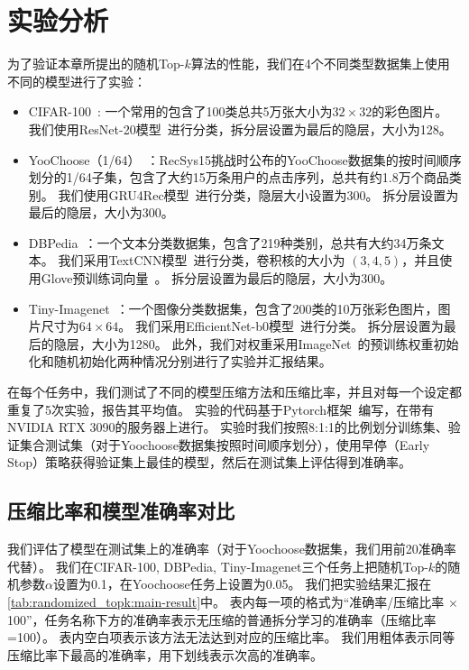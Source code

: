 \section{实验分析}

为了验证本章所提出的随机Top-$k$算法的性能，我们在4个不同类型数据集上使用不同的模型进行了实验：
\begin{itemize}
    \item CIFAR-100~\cite{krizhevsky_2009_cifar}: 一个常用的包含了100类总共5万张大小为$32\times 32$的彩色图片。
        我们使用ResNet-20模型~\cite{hekaiming2016resnet}进行分类，拆分层设置为最后的隐层，大小为128。
    \item YooChoose（1/64）~\cite{ben2015yoochoose,lijing_2017_narm}：RecSys15挑战时公布的YooChoose数据集的按时间顺序划分的1/64子集，包含了大约15万条用户的点击序列，总共有约1.8万个商品类别。
        我们使用GRU4Rec模型~\cite{hidasi_2016_gru4rec}进行分类，隐层大小设置为300。
        拆分层设置为最后的隐层，大小为300。
    \item DBPedia~\cite{2007dbpedia}：一个文本分类数据集，包含了219种类别，总共有大约34万条文本。
        我们采用TextCNN模型~\cite{kimyoon2014textcnn}进行分类，卷积核的大小为 $(3,4,5)$，并且使用Glove预训练词向量~\cite{pennington2014glove}。
        拆分层设置为最后的隐层，大小为300。
    \item Tiny-Imagenet~\cite{tiny-imagenet}：一个图像分类数据集，包含了200类的10万张彩色图片，图片尺寸为$64\times 64$。
        我们采用EfficientNet-b0模型~\cite{tanmingxing2019efficientnet}进行分类。
        拆分层设置为最后的隐层，大小为1280。
        此外，我们对权重采用ImageNet~\cite{2009_imagenet}的预训练权重初始化和随机初始化两种情况分别进行了实验并汇报结果。
\end{itemize}
%
在每个任务中，我们测试了不同的模型压缩方法和压缩比率，并且对每一个设定都重复了5次实验，报告其平均值。
%
实验的代码基于Pytorch框架~\cite{2019_pytorch}编写，在带有NVIDIA RTX 3090的服务器上进行。
%
实验时我们按照8:1:1的比例划分训练集、验证集合测试集（对于Yoochoose数据集按照时间顺序划分），使用早停（Early Stop）策略获得验证集上最佳的模型，然后在测试集上评估得到准确率。



\subsection{压缩比率和模型准确率对比}
%
我们评估了模型在测试集上的准确率（对于Yoochoose数据集，我们用前20准确率代替）。
%
我们在CIFAR-100, DBPedia, Tiny-Imagenet三个任务上把随机Top-$k$的随机参数$\alpha$设置为0.1，在Yoochoose任务上设置为0.05。
%
我们把实验结果汇报在\autoref{tab:randomized_topk:main-result}中。
表内每一项的格式为“准确率/压缩比率 $\times$ 100”，任务名称下方的准确率表示无压缩的普通拆分学习的准确率（压缩比率=100）。
表内空白项表示该方法无法达到对应的压缩比率。
我们用粗体表示同等压缩比率下最高的准确率，用下划线表示次高的准确率。


